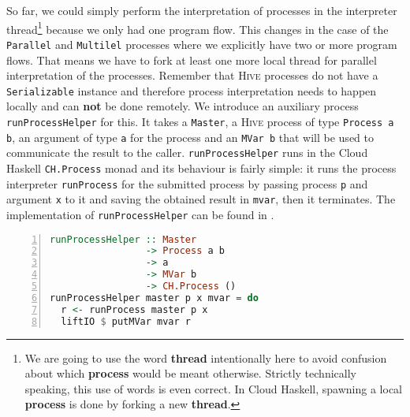 So far, we could simply perform the interpretation of processes in the interpreter thread\footnote{We are going to use the word \textbf{thread} intentionally here to avoid confusion about which \textbf{process} would be meant otherwise. Strictly technically speaking, this use of words is even correct. In \textsf{Cloud Haskell}, spawning a local \textbf{process} is done by forking a new \textbf{thread}.} because we only had one program flow. This changes in the case of the \texttt{Parallel} and \texttt{Multilel} processes where we explicitly have two or more program flows. That means we have to fork at least one more local thread for parallel interpretation of the processes. Remember that \textsc{Hive} processes do not have a \texttt{Serializable} instance and therefore process interpretation needs to happen locally and can \textbf{not} be done remotely. We introduce an auxiliary process \texttt{runProcessHelper} for this. It takes a \texttt{Master}, a \textsc{Hive} process of type \texttt{Process a b}, an argument of type \texttt{a} for the process and an \texttt{MVar b} that will be used to communicate the result to the caller. \texttt{runProcessHelper} runs in the \textsf{Cloud Haskell} \texttt{CH.Process} monad and its behaviour is fairly simple: it runs the process interpreter \texttt{runProcess} for the submitted process by passing process \texttt{p} and argument \texttt{x} to it and saving the obtained result in \texttt{mvar}, then it terminates. The implementation of \texttt{runProcessHelper} can be found in .
\begin{lstlisting}[language=Haskell,caption=Auxiliary process for the interpretation of \texttt{Parallel} and \texttt{Multilel} processes.,label=lst:runprocesshelper,numbers=left,frame=bt]
runProcessHelper :: Master
                 -> Process a b
                 -> a
                 -> MVar b
                 -> CH.Process ()
runProcessHelper master p x mvar = do
  r <- runProcess master p x
  liftIO $ putMVar mvar r
\end{lstlisting}


